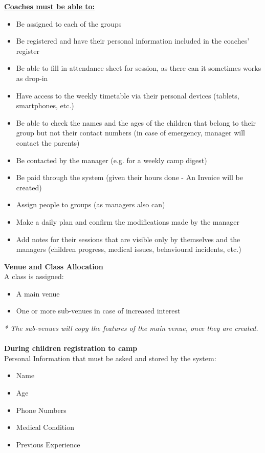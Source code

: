 \documentclass{l3proj}
\begin{document}
\textbf{\underline{Coaches must be able to:}}
	\begin{itemize}
	\item Be assigned to each of the groups
	\item Be registered and have their personal information included in the coaches' register
	\item Be able to fill in attendance sheet for session, as there can it sometimes works as drop-in
	\item Have access to the weekly timetable via their personal devices (tablets, smartphones, etc.)
	\item Be able to check the names and the ages of the children that belong to their group but not their contact numbers (in case of emergency, manager will contact the parents)
	\item Be contacted by the manager (e.g. for a weekly camp digest)
	\item Be paid through the system (given their hours done - An Invoice will be created)
	\item Assign people to groups (as managers also can)
	\item Make a daily plan and confirm the modifications made by the manager
	\item Add notes for their sessions that are visible only by themselves and the managers (children progress, medical issues, behavioural incidents, etc.)
	\end{itemize}
\textbf{\Large{Venue and Class Allocation}}
\\
A class is assigned:
	\begin{itemize}
	\item A main venue
	\item One or more sub-venues in case of increased interest
	\end{itemize}
\emph{* The sub-venues will copy the features of the main venue, once they are created.}\\
\\
\textbf{During children registration to camp}\\
Personal Information that must be asked and stored by the system:
	\begin{itemize}
	\item Name
	\item Age
	\item Phone Numbers
	\item Medical Condition
	\item Previous Experience
	\end{itemize}
\end{document}
